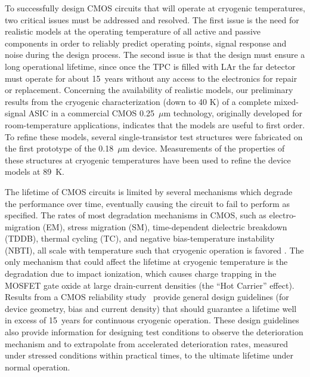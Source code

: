 To successfully design CMOS circuits that will operate at cryogenic 
temperatures, two critical issues must be addressed and resolved. 
The first issue is the need for realistic models at the operating temperature 
of all active and passive components in order to reliably predict operating points,
signal response and noise during the design process.
The second issue is that the design must ensure a long operational lifetime, since once the TPC is filled 
with LAr the far detector must operate for about 15~years without any access to the 
electronics for repair or replacement.
Concerning the availability of realistic models, 
our preliminary results from the cryogenic characterization (down to 40 K) of a complete 
mixed-signal ASIC \cite{CMOS-Compton} in a commercial CMOS 0.25~$\mu$m technology, 
originally developed for room-temperature applications, indicates that the models 
are useful to first order.
To refine these models, several 
single-transistor test structures were fabricated on the first prototype of the 0.18~$\mu$m device. 
Measurements of the properties of these structures at cryogenic temperatures 
have been used to refine the device models at 89~K. 

The lifetime of CMOS circuits is limited by several mechanisms which degrade 
the performance over time, eventually causing the circuit to fail to perform as specified. 
The rates of most degradation mechanisms in CMOS, such as electro-migration (EM), 
stress migration (SM), time-dependent dielectric breakdown (TDDB), thermal cycling (TC), 
and negative bias-temperature instability (NBTI), all scale with temperature such that 
cryogenic operation is favored \cite{CMOS-lifetime}\cite{PMOS-model}. The only mechanism 
that could affect the lifetime at cryogenic temperature is the degradation due to 
impact ionization, which causes charge trapping in the MOSFET gate oxide at 
large drain-current densities (the ``Hot Carrier'' effect).
Results from a CMOS reliability study~\cite{CMOS-reliability} 
provide general design guidelines (for device geometry, bias and current density) 
that should guarantee a lifetime well in excess of 15~years for continuous cryogenic operation. 
These design guidelines also provide information for designing test conditions to observe the 
deterioration mechanism and to extrapolate from accelerated deterioration rates, 
measured under stressed conditions within practical times, to the ultimate lifetime under normal operation.

